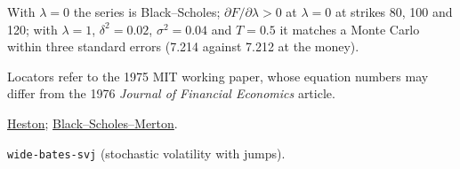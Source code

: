 \begin{qfmodel}
 With $\lambda=0$ the series is Black--Scholes; $\partial F/\partial\lambda>0$ at $\lambda=0$ at strikes 80, 100 and 120; with $\lambda=1$, $\delta^2=0.02$, $\sigma^2=0.04$ and $T=0.5$ it matches a Monte Carlo within three standard errors (7.214 against 7.212 at the money).

 Locators refer to the 1975 MIT working paper, whose equation numbers may differ from the 1976 \emph{Journal of Financial Economics} article.

 \hyperref[mod:heston-stochastic-volatility]{Heston}; \hyperref[mod:black-scholes-merton]{Black--Scholes--Merton}.

 \nolinkurl{wide-bates-svj} (stochastic volatility with jumps).

\end{qfmodel}

